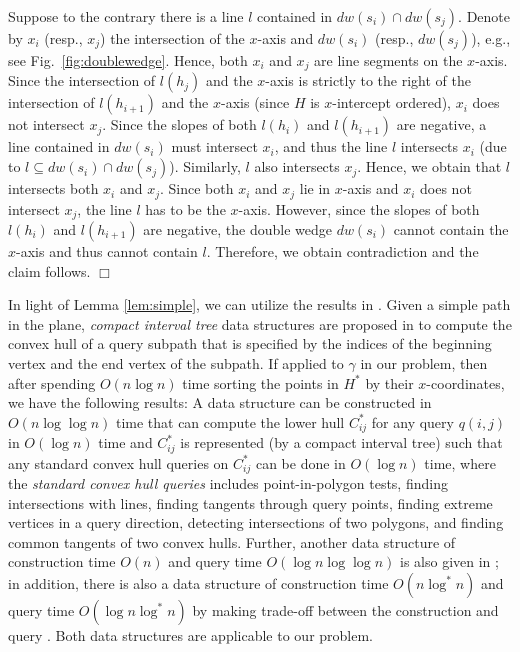 \documentclass{llncs}
\newenvironment{myproof}{\noindent {\textbf{Proof:}}\rm}{\hfill $\Box$\rm}
\begin{document}
\begin{myproof}
Suppose to the contrary there is a line $l$ contained in
$dw(s_i)\cap dw(s_j)$. Denote by $x_i$ (resp., $x_j$) the
intersection of the $x$-axis and $dw(s_i)$ (resp., $dw(s_j)$), e.g.,
see Fig.~\ref{fig:doublewedge}. Hence, both $x_i$ and $x_j$ are line
segments on the $x$-axis. Since the intersection of
$l(h_j)$ and the $x$-axis is strictly to the right of the intersection of
$l(h_{i+1})$ and the $x$-axis (since $H$ is $x$-intercept
ordered), $x_i$ does not intersect $x_j$. Since the slopes of both
$l(h_i)$ and $l(h_{i+1})$ are negative, a line contained in
$dw(s_i)$ must intersect $x_i$, and thus the line $l$ intersects $x_i$
(due to $l\subseteq dw(s_i)\cap dw(s_j)$).
Similarly, $l$ also intersects $x_j$. Hence, we obtain that $l$
intersects both $x_i$ and $x_j$. Since both $x_i$ and $x_j$ lie in
$x$-axis and $x_i$ does not intersect $x_j$,
the line $l$ has to be the $x$-axis. However, since the slopes of both
$l(h_i)$ and $l(h_{i+1})$ are negative, the
double wedge $dw(s_i)$ cannot contain the $x$-axis and thus cannot
contain $l$. Therefore, we obtain contradiction and the claim follows.
\end{myproof}

In light of Lemma \ref{lem:simple}, we can utilize the results in
\cite{ref:GuibasCo91}. Given a simple path in the plane,
{\em compact interval tree} data structures are proposed in
\cite{ref:GuibasCo91} to compute the convex hull of a query subpath
that is specified by the indices of the beginning vertex and the end
vertex of the subpath.
If applied to $\gamma$ in our problem, then after spending $O(n\log
n)$ time sorting the points in $H^*$ by their $x$-coordinates,
we have the following results: A data structure can be constructed in
$O(n\log\log n)$ time that can compute the lower hull $C^*_{ij}$ for
any query $q(i,j)$ in $O(\log n)$ time and $C^*_{ij}$ is represented
(by a compact interval tree) such that any standard convex hull
queries on $C^*_{ij}$ can be done in $O(\log n)$ time, where the
{\em standard convex hull queries} includes point-in-polygon tests,
finding intersections with lines, finding tangents through query
points, finding extreme vertices in a query direction, detecting
intersections of two polygons, and finding common tangents of
two convex hulls. Further, another data structure of construction time
$O(n)$ and query time $O(\log n\log\log n)$ is also given in
\cite{ref:GuibasCo91};  in
addition, there is also a data structure of construction time
$O(n\log^*n)$ and query time $O(\log n\log^* n)$ by making trade-off
between the construction and query \cite{ref:GuibasCo91}.
Both data structures are applicable to our problem.
\end{document}

